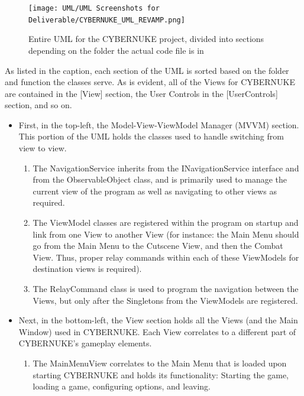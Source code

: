 \documentclass[10pt,conference,onecolumn,compsoc]{IEEEtran}
\begin{document}
\begin{figure}[h]
\centering
\texttt{[image: UML/UML Screenshots for Deliverable/CYBERNUKE\_UML\_REVAMP.png]}
\caption{Entire UML for the CYBERNUKE project, divided into sections depending on the folder the actual code file is in}
\label{uml_view}
\end{figure}

As listed in the caption, each section of the UML is sorted based on the folder and function the classes serve. As is evident, all of the Views for CYBERNUKE are contained in the [View] section, the User Controls in the [UserControls] section, and so on.

\begin{itemize}

	\item First, in the top-left, the Model-View-ViewModel Manager (MVVM) section. This portion of the UML holds the classes used to handle switching from view to view. 

	\begin{enumerate}
	\item The NavigationService inherits from the INavigationService interface and from the ObservableObject class, and is primarily used to manage the current view of the program as well as navigating to other views as required. 
	
	\item The ViewModel classes are registered within the program on startup and link from one View to another View (for instance: the Main Menu should go from the Main Menu to the Cutscene View, and then the Combat View. Thus, proper relay commands within each of these ViewModels for destination views is required). 
	
	\item The RelayCommand class is used to program the navigation between the Views, but only after the Singletons from the ViewModels are registered.
	\end{enumerate}
	
\item Next, in the bottom-left, the View section holds all the Views (and the Main Window) used in CYBERNUKE. Each View correlates to a different part of CYBERNUKE's gameplay elements. 

	\begin{enumerate}
	\item The MainMenuView correlates to the Main Menu that is loaded upon starting CYBERNUKE and holds its functionality: Starting the game, loading a game, configuring options, and leaving. 
	

\end{enumerate}
\end{itemize}
\end{document}
